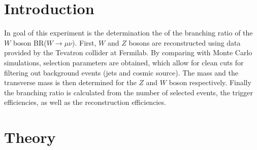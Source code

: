 \documentclass[twoside,        %
               BCOR12mm,       %
               ngerman,english, %
               fleqn,headsepline=false,footsepline=false
              ]{Vorlage/MFPREPORT}
\begin{document}
\date{\today}
\CopyNotWanted

\maketitle


\tableofcontents

\clearpage
{}

\section{Introduction}
\label{sec:introduction}
In goal of this experiment is the determination the  of the branching ratio of the $W$ boson
BR($W\rightarrow\mu\nu$). First, $W$ and $Z$ bosons are reconstructed using
data provided by the Tevatron collider at Fermilab. By comparing with Monte Carlo
simulations, selection parameters are obtained, which allow for clean cuts for
filtering out background events (jets and cosmic source). The mass and the
transverse mass is then determined for the $Z$ and $W$ boson respectively.
Finally the branching ratio is calculated from the number of selected events,
the trigger efficiencies, as well as the reconstruction efficiencies.


\section{Theory}
\label{sec:theory}
\end{document}
